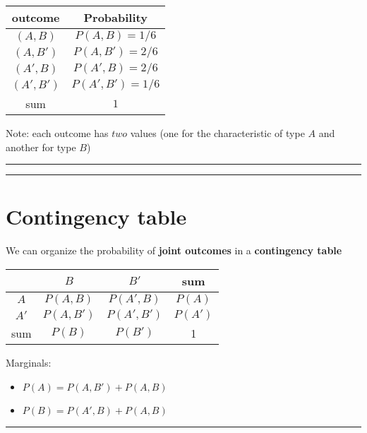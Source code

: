 \documentclass[
]{book}
\providecommand{\tightlist}{%
  \setlength{\itemsep}{0pt}\setlength{\parskip}{0pt}}
\begin{document}
\begin{longtable}[]{@{}cc@{}}
\toprule
outcome & Probability \\
\midrule
\endhead
\((A, B)\) & \(P(A, B)=1/6\) \\
\((A, B')\) & \(P(A, B')=2/6\) \\
\((A', B)\) & \(P(A', B)=2/6\) \\
\((A', B')\) & \(P(A', B')=1/6\) \\
sum & \(1\) \\
\bottomrule
\end{longtable}

Note: each outcome has \(two\) values (one for the characteristic of type \(A\) and another for type \(B\))

\begin{center}\rule{0.5\linewidth}{0.5pt}\end{center}

\begin{center}\rule{0.5\linewidth}{0.5pt}\end{center}

\hypertarget{contingency-table}{%
\section{Contingency table}\label{contingency-table}}

We can organize the probability of \textbf{joint outcomes} in a \textbf{contingency table}

\begin{longtable}[]{@{}cccc@{}}
\toprule
& \(B\) & \(B'\) & sum \\
\midrule
\endhead
\(A\) & \(P(A, B )\) & \(P(A', B )\) & \(P(A)\) \\
\(A'\) & \(P(A, B' )\) & \(P(A', B' )\) & \(P(A')\) \\
sum & \(P(B)\) & \(P(B')\) & 1 \\
\bottomrule
\end{longtable}

Marginals:

\begin{itemize}
\tightlist
\item
  \(P(A)=P(A, B') + P(A, B)\)
\item
  \(P(B)=P(A', B) +P(A, B)\)
\end{itemize}

\begin{center}\rule{0.5\linewidth}{0.5pt}\end{center}
\end{document}
